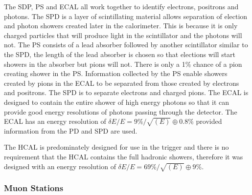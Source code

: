 The SDP, PS and ECAL all work together to identify electrons, positrons and photons. The SPD is a layer of scintillating material allows separation of election and photon showers created later in the calorimeter. This is because it is only charged particles that will produce light in the scintillator and the photons will not. The PS consists of a lead absorber followed by another scintillator similar to the SPD, the length of the lead absorber is chosen so that elections will start showers in the absorber but pions will not. There is only a 1$\%$ chance of a pion creating shower in the PS. Information collected by the PS enable showers created by pions in the ECAL to be separated from those created by electrons and positrons. The SPD is to separate electrons and charged pions. The ECAL is designed to contain the entire shower of high energy photons so that it can provide good energy resolutions of photons passing through the detector. The ECAL has an energy resolution of $\delta E / E = 9\%/\sqrt{(E)} \oplus 0.8\%$  provided information from the PD and SPD are used. 

The HCAL is predominately designed for use in the trigger and there is no requirement that the HCAL contains the full hadronic showers, therefore it was designed with an energy resolution of $\delta E / E = 69\% / \sqrt{(E)} \oplus 9\%$. 


\subsubsection{Muon Stations}
\label{Muon_stations}


